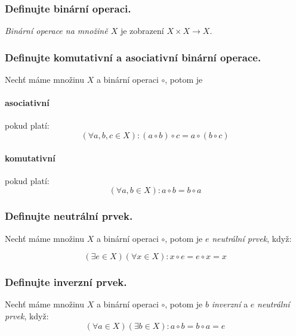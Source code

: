 \documentclass[10pt,a4paper]{article}
\begin{document}
\subsubsection{Definujte binární operaci.}

\textit{Binární operace na množině $X$} je zobrazení $X \times X \to X$.

\subsubsection{Definujte komutativní a asociativní binární operace.}

Nechť máme množinu $X$ a binární operaci $\circ$, potom je

\paragraph{asociativní} pokud platí:
\begin{equation*}
    (\forall a,b,c \in X): (a \circ b) \circ c = a \circ (b \circ c)
\end{equation*}

\paragraph{komutativní} pokud platí:
\begin{equation*}
    (\forall a,b \in X): a \circ b = b \circ a
\end{equation*}
 
\subsubsection{Definujte neutrální prvek.}

Nechť máme množinu $X$ a binární operaci $\circ$, potom je $e$ \textit{neutrální prvek}, když:

\begin{equation*}
    (\exists e \in X)(\forall x \in X): x \circ e = e \circ x = x
\end{equation*}

\subsubsection{Definujte inverzní prvek.}

Nechť máme množinu $X$ a binární operaci $\circ$, potom je $b$ \textit{inverzní} a $e$ \textit{neutrální prvek}, když:
\begin{equation*}
    (\forall a \in X)(\exists b \in X): a \circ b = b \circ a = e
\end{equation*}
\end{document}
